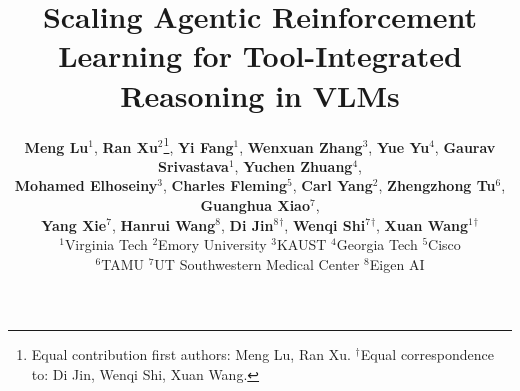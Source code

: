 \documentclass[10pt,twocolumn,letterpaper]{article}
\title{Scaling Agentic Reinforcement Learning for Tool-Integrated Reasoning in VLMs}
\author{\textbf{Meng Lu}$^1$\footnotemark[1], \textbf{Ran Xu}$^2$\thanks{Equal contribution first authors: Meng Lu, Ran Xu. $^\dag$Equal correspondence to: Di Jin, Wenqi Shi, Xuan Wang.}, \textbf{Yi Fang}$^1$, \textbf{Wenxuan Zhang}$^3$, \textbf{Yue Yu}$^4$, \textbf{Gaurav Srivastava}$^1$, \textbf{Yuchen Zhuang}$^4$,\\
\textbf{Mohamed Elhoseiny}$^3$, \textbf{Charles Fleming}$^5$, \textbf{Carl Yang}$^2$, \textbf{Zhengzhong Tu}$^6$, \textbf{Guanghua Xiao}$^7$,\\
\textbf{Yang Xie}$^7$, \textbf{Hanrui Wang}$^8$, \textbf{Di Jin}$^8$$^\dag$, \textbf{Wenqi Shi}$^7$$^\dag$, \textbf{Xuan Wang}$^1$$^\dag$\\
$^1$Virginia Tech $^2$Emory University $^3$KAUST $^4$Georgia Tech $^5$Cisco \\
$^6$TAMU $^7$UT Southwestern Medical Center $^8$Eigen AI\\
}
\begin{document}
\maketitle
    






{
    \small
    
    
}

\appendix

\end{document}
